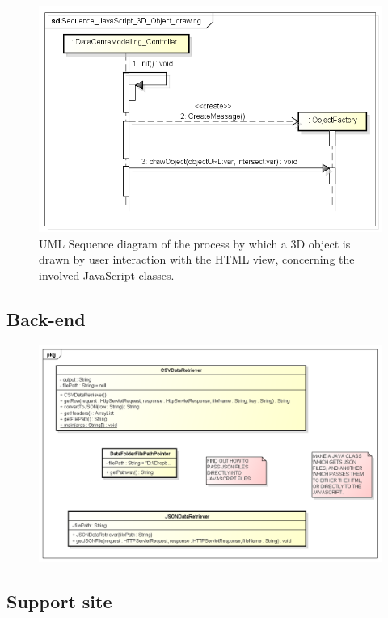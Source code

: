 \begin{figure}[H]
\centering
\includegraphics[width=5in]{Resources//Design_Diagrams//Sequence_JavaScript_3D_Object_drawing.png}
\caption{UML Sequence diagram of the process by which a 3D object is drawn by user interaction with the HTML view, concerning the involved JavaScript classes.}
\label{}
\end{figure}

\subsection{Back-end}

\begin{figure}[H]
\centering
\includegraphics[width=5in]{Resources//Design_Diagrams//Class_Java Back-end.png}
\caption{}
\label{}
\end{figure}

\subsection{Support site}

